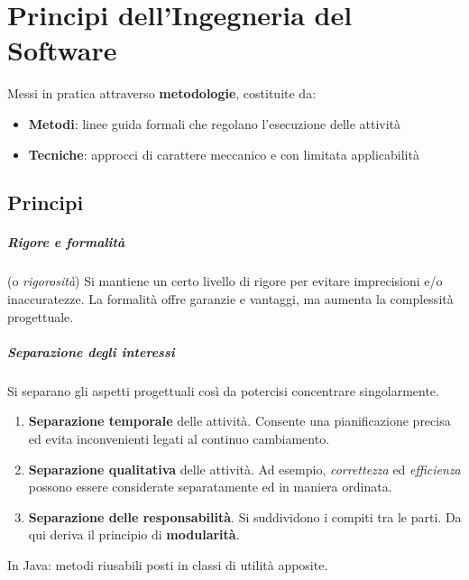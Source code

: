 \chapter{Principi dell'Ingegneria del Software}

Messi in pratica attraverso \textbf{metodologie}, costituite da:
\begin{itemize}
    \item \textbf{Metodi}: linee guida formali che regolano l'esecuzione delle attività
    \item \textbf{Tecniche}: approcci di carattere meccanico e con limitata applicabilità
\end{itemize}

\section{Principi}

\paragraph{Rigore e formalità} (o \textit{rigorosità}) Si mantiene un certo livello di rigore per evitare imprecisioni e/o inaccuratezze. La formalità offre garanzie e vantaggi, ma aumenta la complessità progettuale.

\paragraph{Separazione degli interessi} Si separano gli aspetti progettuali così da potercisi concentrare singolarmente.
\begin{enumerate}
    \item \textbf{Separazione temporale} delle attività. Consente una pianificazione precisa ed evita inconvenienti legati al continuo cambiamento.
    \item \textbf{Separazione qualitativa} delle attività. Ad esempio, \textit{correttezza} ed \textit{efficienza} possono essere considerate separatamente ed in maniera ordinata.
    \item \textbf{Separazione delle responsabilità}. Si suddividono i compiti tra le parti. Da qui deriva il principio di \textbf{modularità}.
\end{enumerate}
In Java: metodi riusabili posti in classi di utilità apposite.

